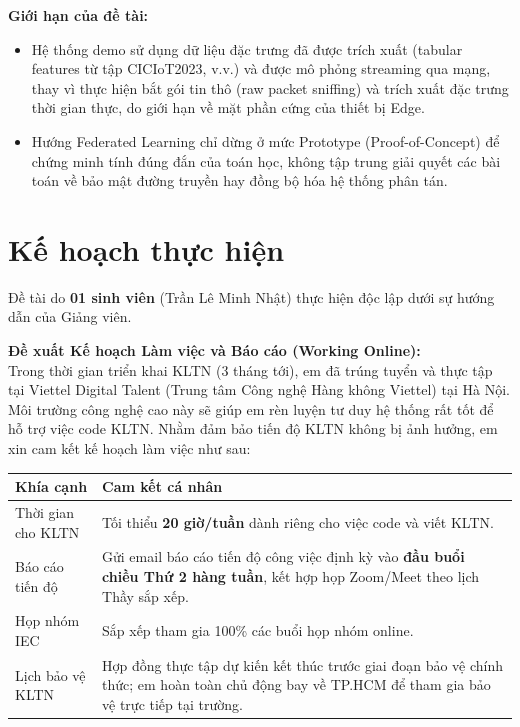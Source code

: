 \documentclass[12pt,a4paper]{article}
\begin{document}
\textbf{Giới hạn của đề tài:}
\begin{itemize}
    \item Hệ thống demo sử dụng dữ liệu đặc trưng đã được trích xuất (tabular features từ tập CICIoT2023, v.v.) và được mô phỏng streaming qua mạng, thay vì thực hiện bắt gói tin thô (raw packet sniffing) và trích xuất đặc trưng thời gian thực, do giới hạn về mặt phần cứng của thiết bị Edge.
    \item Hướng Federated Learning chỉ dừng ở mức Prototype (Proof-of-Concept) để chứng minh tính đúng đắn của toán học, không tập trung giải quyết các bài toán về bảo mật đường truyền hay đồng bộ hóa hệ thống phân tán.
\end{itemize}


\section{Kế hoạch thực hiện}

Đề tài do \textbf{01 sinh viên} (Trần Lê Minh Nhật) thực hiện độc lập dưới sự hướng dẫn của Giảng viên.

\textbf{Đề xuất Kế hoạch Làm việc và Báo cáo (Working Online):} \\
Trong thời gian triển khai KLTN (3 tháng tới), em đã trúng tuyển và thực tập tại Viettel Digital Talent (Trung tâm Công nghệ Hàng không Viettel) tại Hà Nội. Môi trường công nghệ cao này sẽ giúp em rèn luyện tư duy hệ thống rất tốt để hỗ trợ việc code KLTN. Nhằm đảm bảo tiến độ KLTN không bị ảnh hưởng, em xin cam kết kế hoạch làm việc như sau:

\begin{table}[h!]
\centering
\begin{tabularx}{\textwidth}{lX}
\toprule
\textbf{Khía cạnh} & \textbf{Cam kết cá nhân} \\
\midrule
Thời gian cho KLTN & Tối thiểu \textbf{20 giờ/tuần} dành riêng cho việc code và viết KLTN. \\[0.3em]
Báo cáo tiến độ    & Gửi email báo cáo tiến độ công việc định kỳ vào \textbf{đầu buổi chiều Thứ 2 hàng tuần}, kết hợp họp Zoom/Meet theo lịch Thầy sắp xếp. \\[0.3em]
Họp nhóm IEC       & Sắp xếp tham gia 100\% các buổi họp nhóm online. \\[0.3em]
Lịch bảo vệ KLTN   & Hợp đồng thực tập dự kiến kết thúc trước giai đoạn bảo vệ chính thức; em hoàn toàn chủ động bay về TP.HCM để tham gia bảo vệ trực tiếp tại trường. \\
\bottomrule
\end{tabularx}
\end{table}
\end{document}
